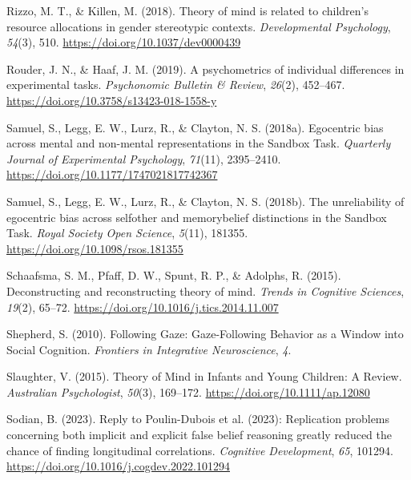 \documentclass[
  man,floatsintext]{apa7}
\newlength{\cslhangindent}
\newlength{\cslentryspacingunit} %
\newenvironment{CSLReferences}[2] %
 {%
  \setlength{\parindent}{0pt}
  \ifodd #1
  \let\oldpar\par
  \def\par{\hangindent=\cslhangindent\oldpar}
  \fi
  \setlength{\parskip}{#2\cslentryspacingunit}
 }%
 {}
\begin{document}
\begin{CSLReferences}{1}{0}
\leavevmode{}%
Rizzo, M. T., \& Killen, M. (2018). Theory of mind is related to children's resource allocations in gender stereotypic contexts. \emph{Developmental Psychology}, \emph{54}(3), 510. \url{https://doi.org/10.1037/dev0000439}

\leavevmode{}%
Rouder, J. N., \& Haaf, J. M. (2019). A psychometrics of individual differences in experimental tasks. \emph{Psychonomic Bulletin \& Review}, \emph{26}(2), 452--467. \url{https://doi.org/10.3758/s13423-018-1558-y}

\leavevmode{}%
Samuel, S., Legg, E. W., Lurz, R., \& Clayton, N. S. (2018a). Egocentric bias across mental and non-mental representations in the {Sandbox Task}. \emph{Quarterly Journal of Experimental Psychology}, \emph{71}(11), 2395--2410. \url{https://doi.org/10.1177/1747021817742367}

\leavevmode{}%
Samuel, S., Legg, E. W., Lurz, R., \& Clayton, N. S. (2018b). The unreliability of egocentric bias across self\textendash other and memory\textendash belief distinctions in the {Sandbox Task}. \emph{Royal Society Open Science}, \emph{5}(11), 181355. \url{https://doi.org/10.1098/rsos.181355}

\leavevmode{}%
Schaafsma, S. M., Pfaff, D. W., Spunt, R. P., \& Adolphs, R. (2015). Deconstructing and reconstructing theory of mind. \emph{Trends in Cognitive Sciences}, \emph{19}(2), 65--72. \url{https://doi.org/10.1016/j.tics.2014.11.007}

\leavevmode{}%
Shepherd, S. (2010). Following {Gaze}: {Gaze-Following Behavior} as a {Window} into {Social Cognition}. \emph{Frontiers in Integrative Neuroscience}, \emph{4}.

\leavevmode{}%
Slaughter, V. (2015). Theory of {Mind} in {Infants} and {Young Children}: {A Review}. \emph{Australian Psychologist}, \emph{50}(3), 169--172. \url{https://doi.org/10.1111/ap.12080}

\leavevmode{}%
Sodian, B. (2023). Reply to {Poulin-Dubois} et al. (2023): {Replication} problems concerning both implicit and explicit false belief reasoning greatly reduced the chance of finding longitudinal correlations. \emph{Cognitive Development}, \emph{65}, 101294. \url{https://doi.org/10.1016/j.cogdev.2022.101294}


\end{CSLReferences}
\end{document}
